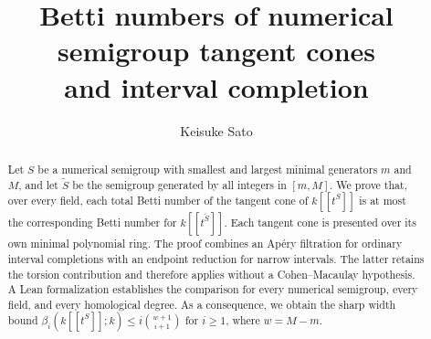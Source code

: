 \documentclass[11pt]{amsart}
\title[Betti numbers and interval completion]{Betti numbers of numerical semigroup tangent cones\texorpdfstring{\\}{ }and interval completion}
\author[Keisuke Sato]{Keisuke Sato}
\date{}
\theoremstyle{definition}
\theoremstyle{remark}
\begin{document}
\raggedbottom
\begin{abstract}
Let $S$ be a numerical semigroup with smallest and largest minimal
generators $m$ and $M$, and let $\widetilde S$ be the semigroup generated
by all integers in $[m,M]$. We prove that, over every field, each total
Betti number of the tangent cone of $k[[t^S]]$ is at most the corresponding
Betti number for $k[[t^{\widetilde S}]]$. Each tangent cone is presented
over its own minimal polynomial ring. The proof combines an Ap\'ery
filtration for ordinary interval completions with an endpoint reduction
for narrow intervals. The latter retains the torsion contribution and
therefore applies without a Cohen--Macaulay hypothesis. A Lean
formalization establishes the comparison for every numerical semigroup,
every field, and every homological degree. As a consequence, we obtain
the sharp width bound $\beta_i(k[[t^S]];k)\le i\binom{w+1}{i+1}$
for $i\ge1$, where $w=M-m$.
\end{abstract}
\maketitle






\appendix




\end{document}
